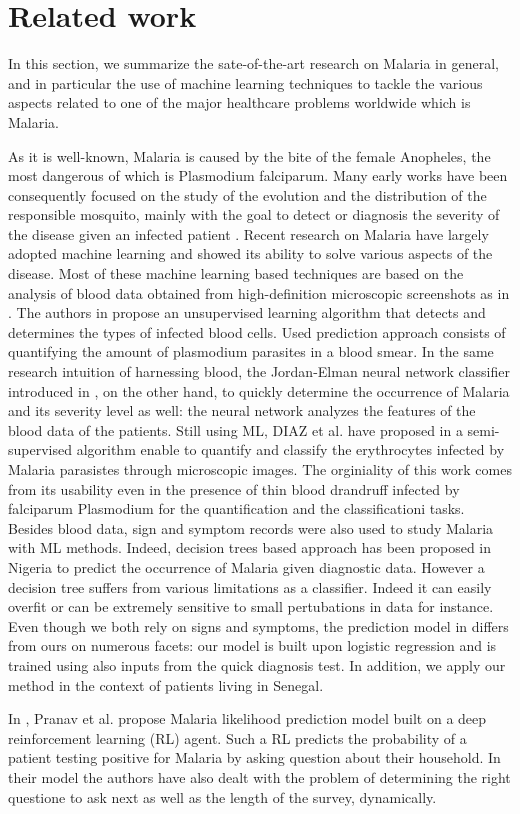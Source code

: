 \section{Related work}\label{related_work}
In this section, we summarize the sate-of-the-art research on Malaria in general, and in particular the
use of machine learning techniques to tackle the various aspects related to one of the 
major healthcare problems worldwide which is Malaria.

As it is well-known, Malaria is caused by the bite of the female Anopheles, the most dangerous of which
is Plasmodium falciparum. Many early works have been consequently focused on the study of the evolution and
the distribution of the responsible mosquito, mainly with the goal to detect or diagnosis the severity of the 
disease given an infected patient \cite{Fe03,Al09}. Recent research on Malaria have largely adopted machine learning
and showed its ability to solve various aspects of the disease. Most of these machine learning based techniques are 
based on the analysis of blood data obtained from high-definition microscopic screenshots as in \cite{Ku18}. The authors
in \cite{Ku18} propose an unsupervised learning algorithm that detects and determines the types of infected blood cells.
Used prediction approach consists of quantifying the amount of plasmodium parasites in a blood smear. In the same research intuition
of harnessing blood, the Jordan-Elman neural network classifier introduced in \cite{Ha15}, on the other hand, to quickly determine the occurrence 
of Malaria and its severity level as well: the neural network analyzes the features of the blood data of the patients.  
Still using ML, DIAZ et al. have proposed in \cite{Dia09} a semi-supervised algorithm enable to quantify and classify the 
erythrocytes infected by Malaria parasistes through microscopic images. The orginiality of this work comes from its usability
even in the presence of thin blood drandruff infected by falciparum Plasmodium for the quantification and the classificationi tasks.
Besides blood data, sign and symptom records were also used to study Malaria with ML methods. Indeed, decision trees based approach
has been proposed in Nigeria \cite{Ug10} to predict the occurrence of Malaria given diagnostic data. However a decision tree suffers 
from various limitations as a classifier. Indeed it can easily overfit or can be extremely sensitive to small pertubations in data for instance.
Even though we both rely on signs and symptoms, the prediction model in \cite{Ug10} differs from ours on numerous facets: our model is built upon
logistic regression and is trained using also inputs from the quick diagnosis test. In addition, we apply our method in the context of patients living in Senegal. 

In \cite{Pr17}, Pranav et al. propose Malaria likelihood prediction model built on a deep reinforcement learning (RL) agent. 
Such a RL predicts the probability of a patient testing positive for Malaria by asking question about their household. In 
their model the authors have also dealt with the problem of determining the right questione to ask next as well as the length of the survey, dynamically.
